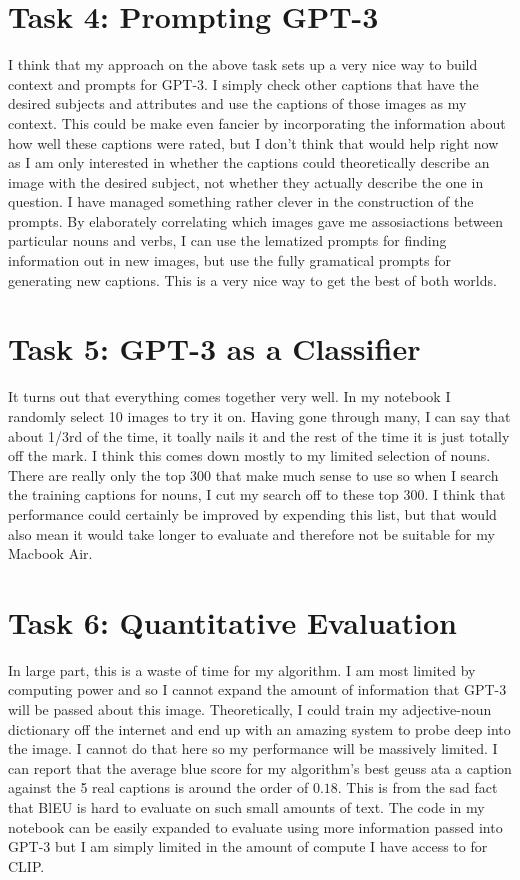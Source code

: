 \documentclass{article}
\begin{document}
\section*{Task 4: Prompting GPT-3}
I think that my approach on the above task sets up a very nice way to build context and prompts for GPT-3. I simply check other captions that have the desired subjects and attributes and use the captions of those images as my context. This could be make even fancier by incorporating the information about how well these captions were rated, but I don't think that would help right now as I am only interested in whether the captions could theoretically describe an image with the desired subject, not whether they actually describe the one in question. I have managed something rather clever in the construction of the prompts. By elaborately correlating which images gave me assosiactions between particular nouns and verbs, I can use the lematized prompts for finding information out in new images, but use the fully gramatical prompts for generating new captions. This is a very nice way to get the best of both worlds. 

\section*{Task 5: GPT-3 as a Classifier}
It turns out that everything comes together very well. In my notebook I randomly select 10 images to try it on. Having gone through many, I can say that about 1/3rd of the time, it toally nails it and the rest of the time it is just totally off the mark. I think this comes down mostly to my limited selection of nouns. There are really only the top 300 that make much sense to use so when I search the training captions for nouns, I cut my search off to these top 300. I think that performance could certainly be improved by expending this list, but that would also mean it would take longer to evaluate and therefore not be suitable for my Macbook Air.


\section*{Task 6: Quantitative Evaluation}
In large part, this is a waste of time for my algorithm. I am most limited by computing power and so I cannot expand the amount of information that GPT-3 will be passed about this image. Theoretically, I could train my adjective-noun dictionary off the internet and end up with an amazing system to probe deep into the image. I cannot do that here so my performance will be massively limited. I can report that the average blue score for my algorithm's best geuss ata a caption against the 5 real captions is around the order of $0.18$. This is from the sad fact that BlEU is hard to evaluate on such small amounts of text. The code in my notebook can be easily expanded to evaluate using more information passed into GPT-3 but I am simply limited in the amount of compute I have access to for CLIP.
\end{document}
